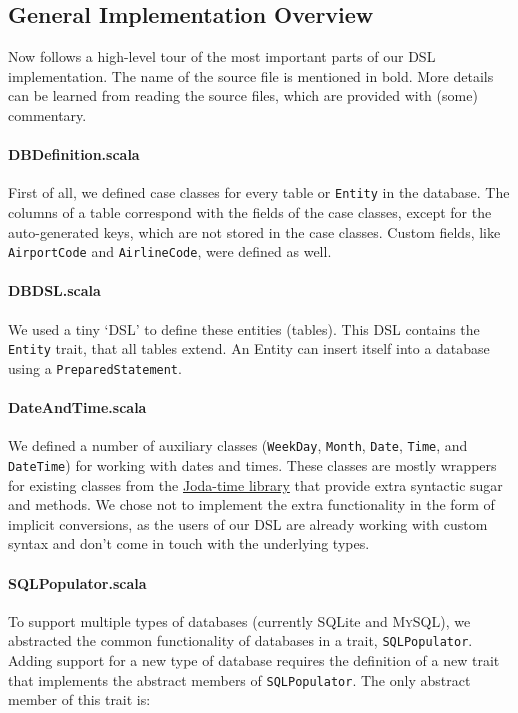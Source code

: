 \documentclass[a4paper]{article}
\newcommand{\cc}[1]{\texttt{#1}}
\begin{document}
\subsection{General Implementation Overview}
\label{sec:general-implementation-overview}

Now follows a high-level tour of the most important parts of our DSL implementation.
The name of the source file is mentioned in bold.
More details can be learned from reading the source files, which are provided with (some) commentary.

\paragraph{DBDefinition.scala}
First of all, we defined case classes for every table or \cc{Entity} in the database.
The columns of a table correspond with the fields of the case classes, except for the auto-generated keys, which are not stored in the case classes.
Custom fields, like \cc{Airport\-Code} and \cc{Air\-line\-Code}, were defined as well.

\paragraph{DBDSL.scala}
We used a tiny `DSL' to define these entities (tables).
This DSL contains the \cc{Entity} trait, that all tables extend.
An Entity can insert itself into a database using a \cc{PreparedStatement}.

\paragraph{DateAndTime.scala}
We defined a number of auxiliary classes (\cc{WeekDay}, \cc{Month}, \cc{Date}, \cc{Time}, and \cc{DateTime}) for working with dates and times.
These classes are mostly wrappers for existing classes from the \href{http://joda-time.sourceforge.net/}{Joda-time library} that provide extra syntactic sugar and methods.
We chose not to implement the extra functionality in the form of implicit conversions, as the users of our DSL are already working with custom syntax and don't come in touch with the underlying types.

\paragraph{SQLPopulator.scala}
To support multiple types of databases (currently SQLite and \textsc{MySQL}), we abstracted the common functionality of databases in a trait, \cc{SQL\-Populator}.
Adding support for a new type of database requires the definition of a new trait that implements the abstract members of \cc{SQL\-Populator}.
The only abstract member of this trait is:
\end{document}
